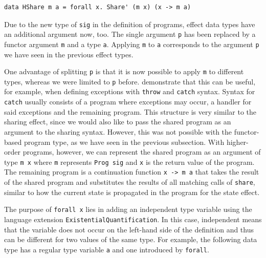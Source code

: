 \documentclass[a4paper, 11pt, fleqn, twoside, abstract=on]{scrreprt}
\newcommand{\hinl}[1]{\texttt{#1}}
\begin{document}
\begin{verbatim}
data HShare m a = forall x. Share' (m x) (x -> m a)
\end{verbatim}

Due to the new type of \hinl{sig} in the definition of programs, effect data types have an additional argument now, too.
The single argument \hinl{p} has been replaced by a functor argument \hinl{m} and a type \hinl{a}.
Applying \hinl{m} to \hinl{a} corresponds to the argument \hinl{p} we have seen in the previous effect types.

One advantage of splitting \hinl{p} is that it is now possible to apply \hinl{m} to different types, whereas we were limited to \hinl{p} before.
\citet{wu2014effect} demonstrate that this can be useful, for example, when defining exceptions with \hinl{throw} and \hinl{catch} syntax.
Syntax for \hinl{catch} usually consists of a program where exceptions may occur, a handler for said exceptions and the remaining program.
This structure is very similar to the sharing effect, since we would also like to pass the shared program as an argument to the sharing syntax.
However, this was not possible with the functor-based program type, as we have seen in the previous subsection.
With higher-order programs, however, we can represent the shared program as an argument of type \hinl{m x} where \hinl{m} represents \hinl{Prog sig} and \hinl{x} is the return value of the program.
The remaining program is a continuation function \hinl{x -> m a} that takes the result of the shared program and substitutes the results of all matching calls of \hinl{share}, similar to how the current state is propagated in the program for the state effect.

The purpose of \hinl{forall x} lies in adding an independent type variable using the language extension \hinl{ExistentialQuantification}.
In this case, independent means that the variable does not occur on the left-hand side of the definition and thus can be different for two values of the same type.
For example, the following data type has a regular type variable \hinl{a} and one introduced by \hinl{forall}.
\end{document}
